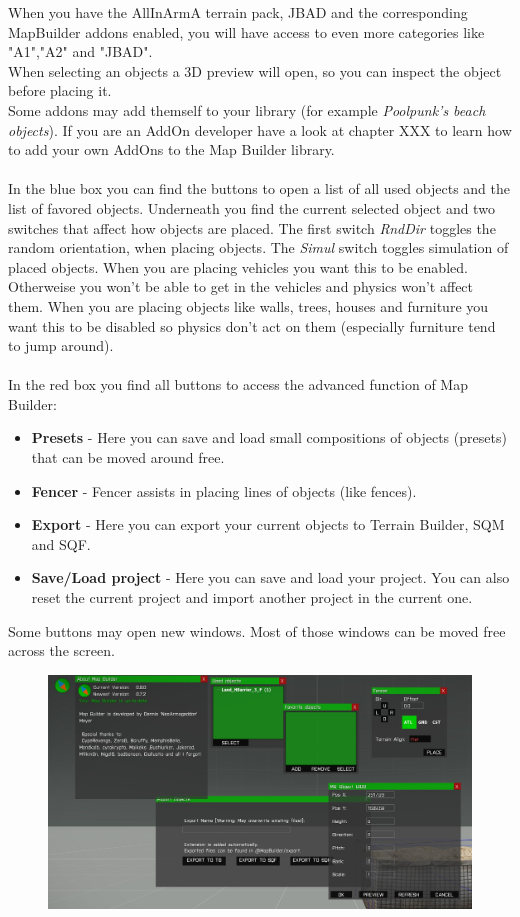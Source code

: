 \documentclass[english]{scrartcl}
\begin{document}
	When you have the AllInArmA terrain pack, JBAD and the corresponding MapBuilder addons enabled, you will have access to even more categories like "A1","A2" and "JBAD".\\
	When selecting an objects a 3D preview will open, so you can inspect the object before placing it.\\
	Some addons may add themself to your library (for example \textit{Poolpunk's beach objects}). If you are an AddOn developer have a look at chapter XXX to learn how to add your own AddOns to the Map Builder library.\\
	\\
	In the blue box you can find the buttons to open a list of all used objects and the list of favored objects. Underneath you find the current selected object and two switches that affect how objects are placed. The first switch \textit{RndDir} toggles the random orientation, when placing objects. The \textit{Simul} switch toggles simulation of placed objects. When you are placing vehicles you want this to be enabled. Otherweise you won't be able to get in the vehicles and physics won't affect them. When you are placing objects like walls, trees, houses and furniture you want this to be disabled so physics don't act on them (especially furniture tend to jump around).\\
	\\
	In the red box you find all buttons to access the advanced function of Map Builder:
	\begin{itemize}
		\item \textbf{Presets} - Here you can save and load small compositions of objects (presets) that can be moved around free.
		\item \textbf{Fencer} - Fencer assists in placing lines of objects (like fences).
		\item \textbf{Export} - Here you can export your current objects to Terrain Builder, SQM and SQF.
		\item \textbf{Save/Load project} - Here you can save and load your project. You can also reset the current project and import another project in the current one.
	\end{itemize}
	Some buttons may open new windows. Most of those windows can be moved free across the screen.\\
		\begin{figure}[hb]
			\centering
			\includegraphics[width=5.8in]{images/mb/windows.png}
		\end{figure}
		\FloatBarrier
	\newpage
\end{document}
